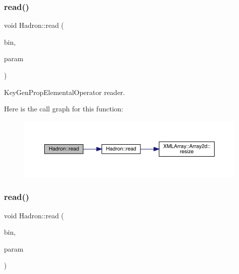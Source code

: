 \subsubsection{\texorpdfstring{read()}{read()}\hspace{0.1cm}{\footnotesize\ttfamily [56/94]}}
{\footnotesize\ttfamily void Hadron\+::read (\begin{DoxyParamCaption}\item[{\mbox{\hyperlink{classADATIO_1_1BinaryReader}{Binary\+Reader}} \&}]{bin,  }\item[{\mbox{\hyperlink{structHadron_1_1KeyGenPropElementalOperator__t}{Key\+Gen\+Prop\+Elemental\+Operator\+\_\+t}} \&}]{param }\end{DoxyParamCaption})}



Key\+Gen\+Prop\+Elemental\+Operator reader. 

Here is the call graph for this function\+:
\nopagebreak
\begin{figure}[H]
\begin{center}
\leavevmode
\includegraphics[width=350pt]{d1/daf/namespaceHadron_ac6d19c651cf61c129b5cf86c15d13ab5_cgraph}
\end{center}
\end{figure}
\mbox{\label{namespaceHadron_a614faa9c1c7ae1880f009d5c9aa672ec}} 
\subsubsection{\texorpdfstring{read()}{read()}\hspace{0.1cm}{\footnotesize\ttfamily [57/94]}}
{\footnotesize\ttfamily void Hadron\+::read (\begin{DoxyParamCaption}\item[{\mbox{\hyperlink{classADATIO_1_1BinaryReader}{Binary\+Reader}} \&}]{bin,  }\item[{\mbox{\hyperlink{structHadron_1_1ValTetraQuarkElementalOperator__t}{Val\+Tetra\+Quark\+Elemental\+Operator\+\_\+t}} \&}]{param }\end{DoxyParamCaption})}



